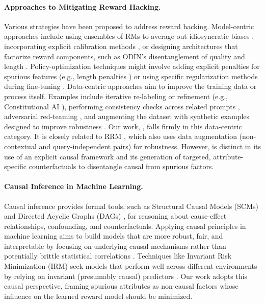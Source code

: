 \paragraph{Approaches to Mitigating Reward Hacking.}
Various strategies have been proposed to address reward hacking. Model-centric approaches include using ensembles of RMs to average out idiosyncratic biases \citep{coste2023reward, eisenstein2023helping, rame2024warm}, incorporating explicit calibration methods \citep{zhao2023slic}, or designing architectures that factorize reward components, such as ODIN's disentanglement of quality and length \citep{chen2024odin, chen2023odin}. Policy-optimization techniques might involve adding explicit penalties for spurious features (e.g., length penalties \citep{park2024disentangling}) or using specific regularization methods during fine-tuning \citep{radford2019language}. Data-centric approaches aim to improve the training data or process itself. Examples include iterative re-labeling or refinement (e.g., Constitutional AI \citep{bai2022constitutional}), performing consistency checks across related prompts \citep{shen2023trickle}, adversarial red-teaming \citep{ganguli2022red}, and augmenting the dataset with synthetic examples designed to improve robustness \citep{pace2024west, shen2024boosting, liu2024rmboost}. Our work, \carma{}, falls firmly in this data-centric category. It is closely related to RRM \citep{liu2024rrm}, which also uses data augmentation (non-contextual and query-independent pairs) for robustness. However, \carma{} is distinct in its use of an explicit causal framework and its generation of targeted, attribute-specific counterfactuals to disentangle causal from spurious factors.

\paragraph{Causal Inference in Machine Learning.}
Causal inference provides formal tools, such as Structural Causal Models (SCMs) and Directed Acyclic Graphs (DAGs) \citep{pearl2009causality, pearl2000causality, peters2017elements}, for reasoning about cause-effect relationships, confounding, and counterfactuals. Applying causal principles in machine learning aims to build models that are more robust, fair, and interpretable by focusing on underlying causal mechanisms rather than potentially brittle statistical correlations \citep{scholkopf2021toward, scholkopf2022causality}. Techniques like Invariant Risk Minimization (IRM) seek models that perform well across different environments by relying on invariant (presumably causal) predictors \citep{arjovsky2019invariant, arjovsky2020invariant, ahuja2021irmv1}. Our work adopts this causal perspective, framing spurious attributes as non-causal factors whose influence on the learned reward model should be minimized.

